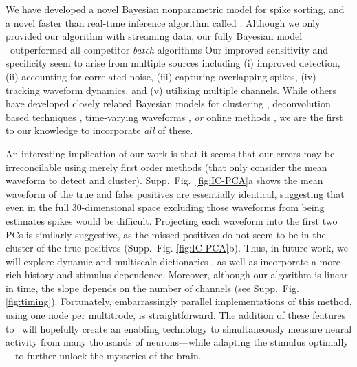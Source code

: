 
We have developed a novel Bayesian nonparametric model for spike sorting, and a novel faster than real-time  inference algorithm called \smug.  
Although we only provided our algorithm with streaming data, our fully Bayesian model \smug\ outperformed all competitor \emph{batch} algorithms 
Our improved sensitivity and specificity seem to arise from multiple sources including (i) improved detection, (ii) accounting for correlated noise, 
(iii) capturing overlapping spikes, (iv) tracking waveform dynamics, and (v) utilizing multiple channels.  
While others have developed closely related Bayesian models for clustering \cite{WoodBla2008,wood2009}, deconvolution based techniques \cite{Pillow2013}, time-varying waveforms \cite{calabrese2011kalman},  \emph{or} online methods \cite{OSORT, Franke2010}, we are the first to our knowledge to incorporate \emph{all} of these.

An interesting implication of our work is that it seems that our errors may be irreconcilable using merely first order methods (that 
only consider the mean waveform to detect and cluster).  Supp.\ Fig.\ \ref{fig:IC-PCA}a shows the mean waveform 
of the true and false positives are essentially identical, suggesting that even in the full 30-dimensional space excluding those waveforms from being 
estimates spikes would be difficult.  
Projecting each waveform into the first two PCs is similarly suggestive,
as the missed positives do not seem to be in the cluster of the true positives (Supp.\ Fig. \ref{fig:IC-PCA}b). 
Thus, in future work, we will explore dynamic and multiscale dictionaries \cite{ChenMaggioni12}, 
as well as incorporate a more rich history and stimulus dependence.  
Moreover, although our algorithm is linear in time, the slope depends on the number of channels (see Supp.\ Fig. \ref{fig:timing}).  
Fortunately, embarrassingly parallel implementations of this method, using one node per multitrode, is straightforward.  
The addition of these features to \smug\ will hopefully create an enabling technology to  simultaneously measure neural activity from many thousands of neurons---while adapting the stimulus optimally---to further unlock the mysteries of the brain.






